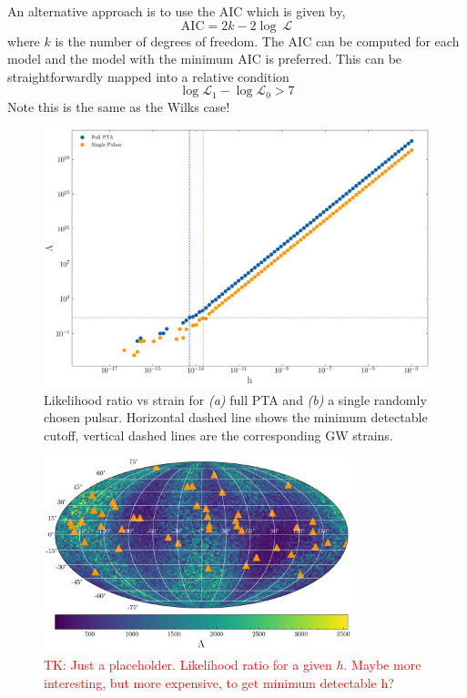 \documentclass[fleqn,usenatbib,useAMS]{mnras}
\begin{document}
An alternative approach is to use the AIC which is given by,
\begin{equation}
	\text{AIC} = 2k - 2\log\ \mathcal{L} 
\end{equation}
where $k$ is the number of degrees of freedom. The AIC can be computed for each model and the model with the minimum AIC is preferred. This can be straightforwardly mapped into a relative condition
\begin{equation}
	\log \mathcal{L}_1 - 	\log \mathcal{L}_0 > 7 
\end{equation}
Note this is the same as the Wilks case!

\noindent 





\begin{figure}
	\includegraphics[width=\columnwidth]{images/snr_canonical}
	\caption{Likelihood ratio vs strain for \textit{(a)} full PTA and \textit{(b)} a single randomly chosen pulsar. Horizontal dashed line shows the minimum detectable cutoff, vertical dashed lines are the corresponding GW strains.}
	\label{fig:SNR}
\end{figure}





\begin{figure}
	\includegraphics[width=0.8\textwidth]{images/snr_mollewide}
	\caption{\textcolor{red}{TK: Just a placeholder. Likelihood ratio for a given $h$. Maybe more interesting, but more expensive, to get minimum detectable h?}}
	\label{fig:mollewide}
\end{figure}
\end{document}
